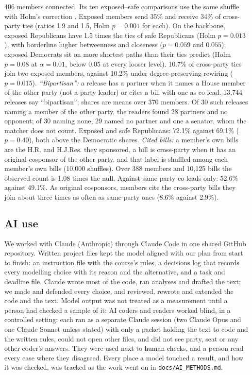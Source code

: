 \documentclass[9pt,twocolumn,twoside]{pnas-new}
\begin{document}
{406 members connected. Its ten exposed--safe comparisons use the same shuffle with Holm's correction
\cite{holm1979}. Exposed members send 35\% and receive 34\% of cross-party ties (ratios 1.9 and 1.5, Holm $p = 0.001$ for each). On
the backbone, exposed Republicans have 1.5 times the ties of safe Republicans (Holm $p = 0.013$), with borderline
higher betweenness and closeness ($p = 0.059$ and $0.055$); exposed Democrats sit on more shortest paths than their
ties predict (Holm $p = 0.08$ at $\alpha = 0.01$, below 0.05 at every looser level). 10.7\% of cross-party ties join
two exposed members, against 10.2\% under degree-preserving rewiring ($p = 0.015$). \emph{``Bipartisan'':} a release has a partner when it names a House member of the other party (not a
party leader) or cites a bill with one as co-lead. 13,744 releases say ``bipartisan''; shares are means over 370 members. Of 30 such releases naming a member of the
other party, the readers found 28 partners and no opponent; of 30 naming none, 29 named no partner and one a senator,
whom the matcher does not count. Exposed and safe Republicans: 72.1\% against 69.1\% ($p = 0.40$), both above the Democratic shares. \emph{Cited bills:} a member's own bills are the H.R. and H.J.Res.
they sponsored, a bill is cross-party when it has an original cosponsor of the other party, and that label is shuffled
among each member's own bills (10,000 shuffles). Over 388 members and 10,125 bills the observed count is 1.08 times the null. Against same-party co-leads only:
52.6\% against 49.1\%. As original cosponsors, members cite the cross-party bills they join about three times as
often as same-party ones (8.6\% against 2.9\%).

\subsection*{AI use}
We worked with Claude (Anthropic) through Claude Code in one shared GitHub repository. Written project files kept the
model aligned with our plan from start to finish: an instruction file with the course's rules, a decisions log that
records every modelling choice with its reason and the alternative, and a task and deadline file. Claude wrote most of
the code, ran analyses and drafted the text; we made and defended every choice, and reviewed, rewrote and extended the
code and the text. Model output was not treated as a measurement until a person had checked a sample of it: AI coders
and readers worked blind, in a controlled setting: each ran as a separate Claude session (two Claude Opus and one
Claude Sonnet unless stated) with only a packet holding the text to code and the written rules, could not open other
files, and did not see party, seat or any other coder's answers. They were used next to human checks, and a person
read every case where they disagreed. Every place a model
touched a result, and how it was checked, was tracked as the work went on in \texttt{docs/AI\_METHODS.md}.

}
\end{document}
